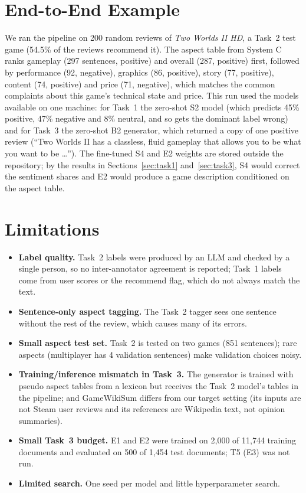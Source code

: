 \documentclass[11pt,a4paper]{article}
\begin{document}
\section{End-to-End Example}
\label{sec:demo}

We ran the pipeline on 200 random reviews of \emph{Two Worlds II HD}, a Task~2 test game
(54.5\% of the reviews recommend it). The aspect table from System C ranks gameplay (297
sentences, positive) and overall (287, positive) first, followed by performance (92,
negative), graphics (86, positive), story (77, positive), content (74, positive) and price (71,
negative), which matches the common complaints about this game's technical state and price.
This run used the models available on one machine: for Task~1 the zero-shot S2 model (which
predicts 45\% positive, 47\% negative and 8\% neutral, and so gets the dominant label wrong)
and for Task~3 the zero-shot B2 generator, which returned a copy of one positive review
(``Two Worlds II has a classless, fluid gameplay that allows you to be what you want to
be \dots''). The fine-tuned S4 and E2 weights are stored outside the repository; by the
results in Sections~\ref{sec:task1} and~\ref{sec:task3}, S4 would correct the sentiment shares
and E2 would produce a game description conditioned on the aspect table.

\section{Limitations}

\begin{itemize}
  \item \textbf{Label quality.} Task~2 labels were produced by an LLM and checked by a single
    person, so no inter-annotator agreement is reported; Task~1 labels come from user scores or
    the recommend flag, which do not always match the text.
  \item \textbf{Sentence-only aspect tagging.} The Task~2 tagger sees one sentence without the
    rest of the review, which causes many of its errors.
  \item \textbf{Small aspect test set.} Task~2 is tested on two games (851 sentences); rare
    aspects (multiplayer has 4 validation sentences) make validation choices noisy.
  \item \textbf{Training/inference mismatch in Task~3.} The generator is trained with pseudo
    aspect tables from a lexicon but receives the Task~2 model's tables in the pipeline; and
    GameWikiSum differs from our target setting (its inputs are not Steam user reviews and its
    references are Wikipedia text, not opinion summaries).
  \item \textbf{Small Task~3 budget.} E1 and E2 were trained on 2,000 of 11,744 training
    documents and evaluated on 500 of 1,454 test documents; T5 (E3) was not run.
  \item \textbf{Limited search.} One seed per model and little hyperparameter search.
\end{itemize}
\end{document}
